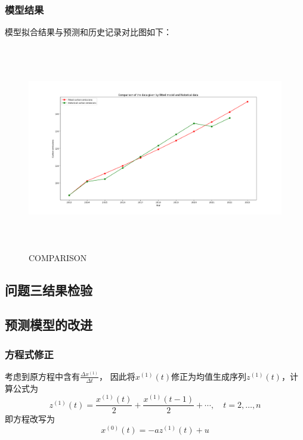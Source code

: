\documentclass[a4paper, 12pt]{article}
\numberwithin{equation}{section}
\begin{document}
                \subsubsection{模型结果}
                    模型拟合结果与预测和历史记录对比图如下：
                    \begin{figure}[h]
                        \centering
                        \includegraphics[height=9cm,width=15cm]{fit_and_his_q4.png}
                        \caption{COMPARISON}
                    \end{figure}

    {}
        \subsection{问题三结果检验}


    {}


    {}
        \subsection{预测模型的改进}
            \subsubsection{方程式修正}
                考虑到原方程中含有$ \frac{\Delta x^{ (1)}}{\Delta t} $，
                因此将$ x^{ (1)} (t) $修正为均值生成序列$ z^{ (1)} (t) $，计算公式为
                \[ z^{ (1)} (t) = \frac{x^{ (1)} (t)}{2} + \frac{x^{ (1)} (t - 1)}{2} + \cdots, \quad t = 2, \ldots, n \]
                即方程改写为
                \[ x^{ (0)} (t) = -az^{ (1)} (t) + u \]
\end{document}
